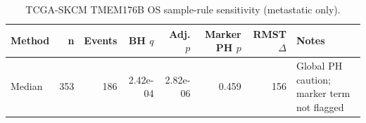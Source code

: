 \begin{table}[t]
\centering
\caption{TCGA-SKCM TMEM176B OS sample-rule sensitivity (metastatic only).}
\label{tab:skcm-tmem176b-os-metastatic-only}
\begin{tabular}{lrrrrrrl}
\toprule
Method & n & Events & BH $q$ & Adj. $p$ & Marker PH $p$ & RMST $\Delta$ & Notes \\
\midrule
Median & 353 & 186 & 2.42e-04 & 2.82e-06 & 0.459 & 156 & Global PH caution; marker term not flagged \\
\bottomrule
\end{tabular}
\end{table}
